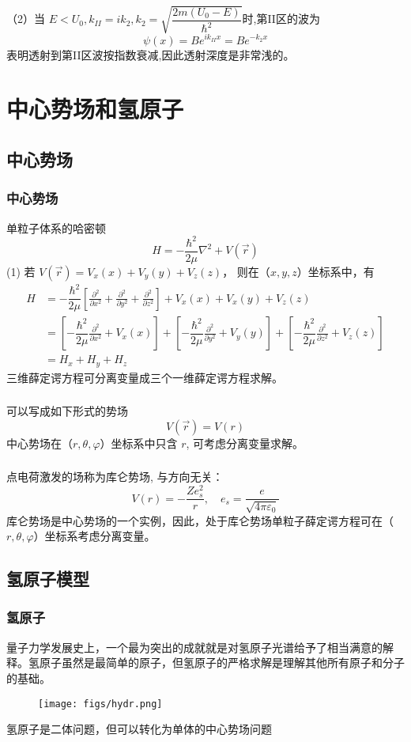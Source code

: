 \begin{frame}
  \frametitle{}
  （2）当 $ E < U_0,
  k_{II}= i k_2,  k_2 = \sqrt{\dfrac{2 m(U_0 -E)}{\hbar^2}}
  $时,第II区的波为
$$
\psi(x)=B e^{i k_{II} x} = B e^{- k_{2} x}
$$
表明透射到第II区波按指数衰减,因此透射深度是非常浅的。
\end{frame} 



\section{中心势场和氢原子}

\subsection{中心势场}
\begin{frame}
  \frametitle{中心势场}
单粒子体系的哈密顿
\[H = -\dfrac{\hbar^2}{2\mu } \nabla ^2 + V(\vec{r})\]
(1) 若 $V(\vec{r})= V_x (x) + V_y (y) + V_z (z) $， 则在（$x,y,z$）坐标系中，有
\[
\begin{aligned}
  H &= -\dfrac{\hbar^2}{2\mu } \left[\frac{\partial ^2 }{\partial x^2 } + \frac{\partial ^2 }{\partial y^2 } + \frac{\partial ^2 }{\partial z^2 } \right] + V_x (x) + V_x (y) + V_z (z) \\
  &=  \left[ -\dfrac{\hbar^2}{2\mu } \frac{\partial ^2 }{\partial x^2 } +  V_x (x)   \right] + \left[ -\dfrac{\hbar^2}{2\mu } \frac{\partial ^2 }{\partial y^2 } +  V_y (y)   \right] + \left[ -\dfrac{\hbar^2}{2\mu } \frac{\partial ^2 }{\partial z^2 } +  V_z (z)   \right] \\
  &= H_x + H_y + H_z
\end{aligned}
  \]
  三维薛定谔方程可分离变量成三个一维薛定谔方程求解。
\end{frame} 

\begin{frame}
  \frametitle{}
  \emf[中心势场:] 可以写成如下形式的势场
  $$V(\vec{r}) = V (r)$$
  中心势场在（$r,\theta,\varphi$）坐标系中只含 $r$, 可考虑分离变量求解。
\end{frame}   

\begin{frame}
  \frametitle{}
  \emf[库仑势场:] 点电荷激发的场称为库仑势场, 与方向无关：
$$
V(r)=-\frac{Z e_s^2}{r}, \quad e_s=\frac{e}{\sqrt{4 \pi \varepsilon_0}}
$$
库仑势场是中心势场的一个实例，因此，处于库仑势场单粒子薛定谔方程可在（$r,\theta,\varphi$）坐标系考虑分离变量。
\end{frame} 

\subsection{氢原子模型} 
\begin{frame}
  \frametitle{氢原子}
  量子力学发展史上，一个最为突出的成就就是对氢原子光谱给予了相当满意的解释。氢原子虽然是最简单的原子，但氢原子的严格求解是理解其他所有原子和分子的基础。
  \begin{figure}[htbp]
    \centering
    \texttt{[image: figs/hydr.png]}
  \end{figure}
  氢原子是二体问题，但可以转化为单体的中心势场问题
\end{frame} 


